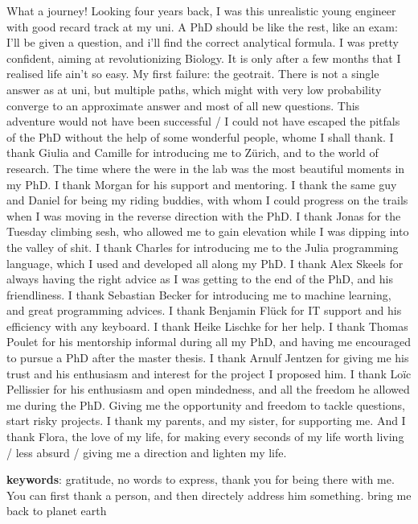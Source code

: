 %
\label{sec:acknowledgement}


What a journey! Looking four years back, I was this unrealistic young engineer with good recard track at my uni. A PhD should be like the rest, like an exam: I'll be given a question, and i'll find the correct analytical formula. 
%
I was pretty confident, aiming at revolutionizing Biology. It is only after a few months that I realised life ain't so easy.
% 
My first failure: the geotrait. There is not a single answer as at uni, but multiple paths, which might with very low probability converge to an approximate answer and most of all new questions.
% 
This adventure would not have been successful / I could not have escaped the pitfals of the PhD without the help of some wonderful people, whome I shall thank.
% 
I thank Giulia and Camille for introducing me to Zürich, and to the world of research. The time where the were in the lab was the most beautiful moments in my PhD.
% 
I thank Morgan for his support and mentoring. I thank the same guy and Daniel for being my riding buddies, with whom I could progress on the trails when I was moving in the reverse direction with the PhD.
% 
I thank Jonas for the Tuesday climbing sesh, who allowed me to gain elevation while I was dipping into the valley of shit.
% 
I thank Charles for introducing me to the Julia programming language, which I used and developed all along my PhD. 
% 
I thank Alex Skeels for always having the right advice as I was getting to the end of the PhD, and his friendliness.
% 
I thank Sebastian Becker for introducing me to machine learning, and great programming advices.
% 
I thank Benjamin Flück for IT support and his efficiency with any keyboard.
% 
I thank Heike Lischke for her help.
% 
I thank Thomas Poulet for his mentorship informal during all my PhD, and having me encouraged to pursue a PhD after the master thesis.
% 
I thank Arnulf Jentzen for giving me his trust and his enthusiasm and interest for the project I proposed him. 
% 
I thank Loïc Pellissier for his enthusiasm and open mindedness, and all the freedom he allowed me during the PhD. Giving me the opportunity and freedom to tackle questions, start risky projects.
% 
I thank my parents, and my sister, for supporting me.
% 
And I thank Flora, the love of my life, for making every seconds of my life worth living / less absurd / giving me a direction and lighten my life.

\textbf{keywords}: gratitude, no words to express, thank you for being there with me. You can first thank a person, and then directely address him something. bring me back to planet earth